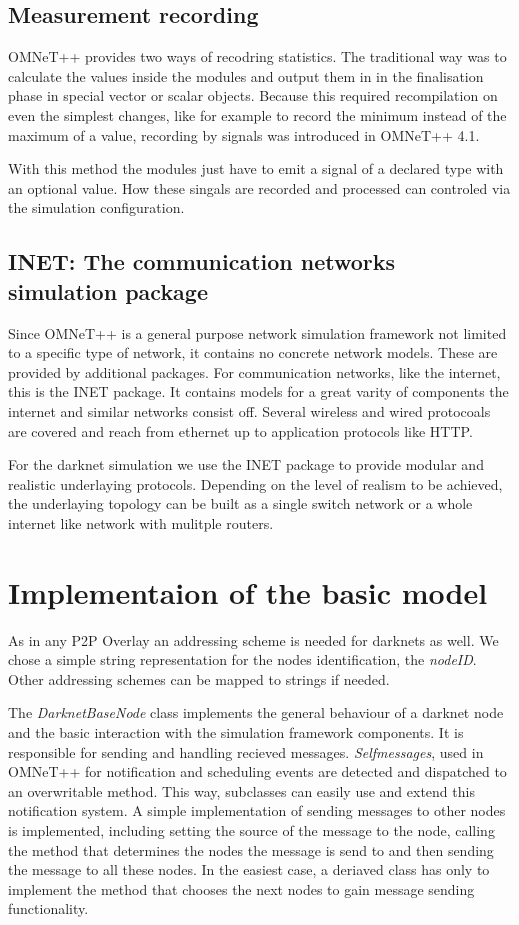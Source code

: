 \subsection{Measurement recording}

OMNeT++ provides two ways of recodring statistics. The traditional way was to calculate the values inside the modules and output them in in the finalisation phase in special vector or scalar objects. Because this required recompilation on even the simplest changes, like for example to record the minimum instead of the maximum of a value, recording by signals was introduced in OMNeT++ 4.1.

With this method the modules just have to emit a signal of a declared type with an optional value. How these singals are recorded and processed can controled via the simulation configuration.

\subsection{INET: The communication networks simulation package}

Since OMNeT++ is a general purpose network simulation framework not limited to a specific type of network, it contains no concrete network models. These are provided by additional packages. For communication networks, like the internet, this is the INET package. It contains models for a great varity of components the internet and similar networks consist off. Several wireless and wired protocoals are covered and reach from ethernet up to application protocols like HTTP.

For the darknet simulation we use the INET package to provide modular and realistic underlaying protocols. Depending on the level of realism to be achieved, the underlaying topology can be built as a single switch network or a whole internet like network with mulitple routers.

\section{Implementaion of the basic model}

As in any P2P Overlay an addressing scheme is needed for darknets as well. We chose a simple string representation for the nodes identification, the \emph{nodeID}. Other addressing schemes can be mapped to strings if needed.

The \emph{DarknetBaseNode} class implements the general behaviour of a darknet node and the basic interaction with the simulation framework components. It is responsible for sending and handling recieved messages. \emph{Selfmessages}, used in OMNeT++ for notification and scheduling events are detected and dispatched to an overwritable method. This way, subclasses can easily use and extend this notification system. A simple implementation of sending messages to other nodes is implemented, including setting the source of the message to the node, calling the method that determines the nodes the message is send to and then sending the message to all these nodes. In the easiest case, a deriaved class has only to implement the method that chooses the next nodes to gain message sending functionality.

